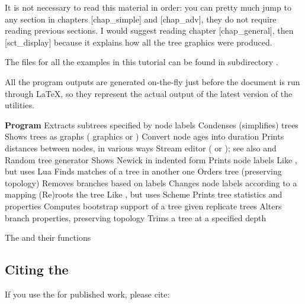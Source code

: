 It is not necessary to read this material in order: you can pretty much jump to
any section in chapters \in{}[chap_simple] and \in{}[chap_adv], they do not
require reading previous sections. I would suggest reading chapter
\in{}[chap_general], then [sct_display] because it explains how all
the tree graphics were produced.

The files for all the examples in this tutorial can be found in
subdirectory .

All the program outputs are generated on-the-fly just before the document is run
through \LaTeX{}, so they represent the actual output of the latest version of
the utilities.

\begin{table}[t]

{\bf Program}  \MR
\HL
\clade		\NC	Extracts subtrees specified by node labels\MR
\condense	\NC	Condenses (simplifies) trees \MR
\display	\NC	Shows trees as graphs (\ascii{} graphics or \svg) \MR
\duration	\NC	Convert node ages into duration \MR
\distance	\NC	Prints distances between nodes, in various ways \MR
\ed				\NC	Stream editor (  or ); see also \luaed{} and \sched \MR
\gen			\NC	Random tree generator \MR
\nwindent	\NC	Shows Newick in indented form \MR 
{}		\NC	Prints node labels \MR
\luaed				\NC	Like \ed, but uses Lua\MR
\match		\NC	Finds matches of a tree in another one \MR
\order		\NC	Orders tree (preserving topology) \MR
\prune		\NC	Removes branches based on labels \MR 
\rename		\NC	Changes node labels according to a mapping \MR
\reroot		\NC	(Re)roots the tree \MR
\sched				\NC	Like \luaed, but uses Scheme\MR
\stats		\NC	Prints tree statistics and properties \MR
\support	\NC	Computes bootstrap support of a tree given replicate trees \MR
\topology	\NC	Alters branch properties, preserving topology \MR
\trim		\NC	Trims a tree at a specified depth
\stoptable	
\caption{The \nutils{} and their functions}
\label{tbl_prog_list}

\end{table}

\subsection*{Citing the \nutils}

If you use the \nutils{} for published work, please cite:


